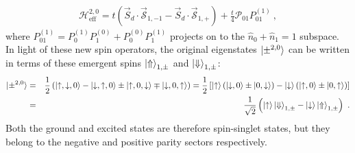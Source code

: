 \begin{eqnarray}
	\mathcal{H}^{2, 0}_\text{eff} = t\left(\vec{S}_d\cdot\vec{\mathcal{S}}_{1,-1} - \vec{S}_d\cdot\vec{\mathcal{S}}_{1,+}\right) + \frac{t}{4}\mathcal{P}_{01} P_{01}^{(1)}~,
\end{eqnarray}
where \(P_{01}^{(1)} = P_{0}^{(1)}P_{1}^{(0)} + P_{0}^{(0)}P_{1}^{(1)}\) projects on to the \(\hat n_0 + \hat n_1 = 1\) subspace. In light of these new spin operators, the original eigenstates \(\ket{\pm^{2,0}}\) can be written in terms of these emergent spins \(\ket{\Uparrow}_{1,\pm}\) and \(\ket{\Downarrow}_{1,\pm}\):
\begin{eqnarray}
	\ket{\pm^{2,0}} &=& \frac{1}{2}\left(\ket{\uparrow,\downarrow,0} - \ket{\downarrow,\uparrow,0} \pm \ket{\uparrow,0,\downarrow} \mp \ket{\downarrow,0,\uparrow}\right) = \frac{1}{2}\left[\ket{\uparrow}\left(\ket{\downarrow,0} \pm \ket{0, \downarrow}\right) - \ket{\downarrow}\left(\ket{\uparrow,0} \pm \ket{0,\uparrow}\right)\right] \nonumber\\
			    &=& \frac{1}{\sqrt 2}\left( \ket{\uparrow}\ket{\Downarrow}_{1,\pm} - \ket{\downarrow}\ket{\Uparrow}_{1,\pm} \right)~.
\end{eqnarray}
Both the ground and excited states are therefore spin-singlet states, but they belong to the negative and positive parity sectors respectively.

